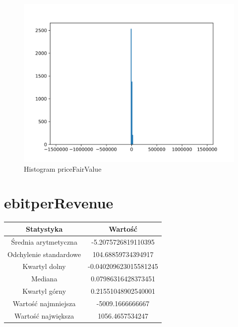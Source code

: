 \documentclass{article}
\begin{document}
\begin{figure}[h!]
    \includegraphics[width=\linewidth]{variables/priceFairValue.png}
    \caption{Histogram priceFairValue }
\end{figure}\section{ ebitperRevenue }

\begin{center}
    \begin{tabular}{|c | c|} 
    \hline
    Statystyka & Wartość \\
    \hline\hline
    Średnia arytmetyczna & -5.2075726819110395 \\ 
    \hline
    Odchylenie standardowe & 104.68859734394917 \\
    \hline
    Kwartyl dolny & -0.040209623015581245 \\
    \hline
    Mediana & 0.07986316428373451 \\
    \hline
    Kwartyl górny & 0.21551048902540001 \\
    \hline
    Wartość najmniejsza & -5009.1666666667 \\
    \hline
    Wartość największa & 1056.4657534247 \\
    \hline
   \end{tabular}
\end{center}
\end{document}
